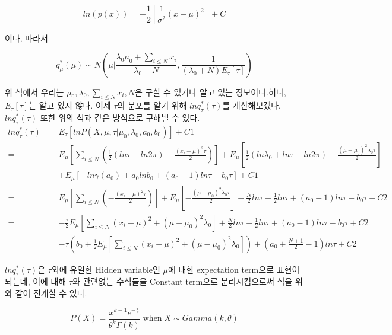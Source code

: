 \documentclass[draft=false]{oblivoir}
\begin{document}
\begin{equation}
ln(p(x)) = -\frac{1}{2} \left[ \frac{1}{\sigma^{2}}(x-\mu)^{2}\right] +C
\label{eq:11-2-10}
\end{equation}

이다. 따라서 

\begin{equation}
q_{\mu}^{*}(\mu) \sim N \left( \mu| \frac{\lambda_{0}\mu_{0}+\sum_{i \leq N}x_{i}}{\lambda_{0}+N} , \frac{1}{(\lambda_{0}+N)E_{\tau}[\tau]}\right)
\label{eq:11-2-11}
\end{equation}

위 식에서 우리는 $\mu_{0},\lambda_{0}, \sum_{i \leq N}x_{i}, N$은 구할 수 있거나 알고 있는 정보이다.허나, $E_{\tau}[\tau]$는 알고 있지 않다. 이제 $\tau$의 분포를 알기 위해 $lnq_{\tau}^{*}(\tau)$를 계산해보겠다.  $lnq_{\tau}^{*}(\tau)$ 또한 위의 식과 같은 방식으로 구해낼 수 있다. 
\begin{align}
lnq_{\tau}^*(\tau)\nonumber = {} & E_{\tau}\left[ lnP(X,\mu,\tau|\mu_{0},\lambda_{0},a_{0},b_{0}) \right] +C1\nonumber\\
= {} & E_{\mu}\left[ \sum_{i \leq N}\left( \frac{1}{2}(ln\tau -ln2 \pi) - \frac{(x_{i}-\mu)^{2}\tau}{2} \right) \right] + E_{\mu}\left[ \frac{1}{2}(ln \lambda_{0} + ln\tau-ln2 \pi ) - \frac{(\mu -\mu_{0})^{2}\lambda_{0}\tau}{2}\right]\nonumber\\
& + E_{\mu}\left[-ln\gamma(a_{0})+a_{0}lnb_{0}+(a_{0}-1)ln\tau-b_{0}\tau  \right]+C1\nonumber\\
= {} & E_{\mu}\left[ \sum_{i \leq N}\left(-\frac{(x_{i}-\mu)^{2}\tau}{2}\right)\right]+E_{\mu}\left[  - \frac{(\mu -\mu_{0})^{2}\lambda_{0} \tau}{2}\right]+\frac{N}{2}ln\tau+\frac{1}{2}ln\tau+(a_{0}-1)ln\tau-b_{0}\tau+C2\nonumber\\
= {} & -\frac{\tau}{2}E_{\mu}\left[\sum_{i \leq N}(x_{i}-\mu)^2+(\mu-\mu_{0})^2\lambda_{0}\right]+\frac{N}{2}ln\tau+\frac{1}{2}ln\tau+(a_{0}-1)ln\tau-b_{0}\tau+C2\nonumber\\
= {} & -\tau\left(b_{0}+\frac{1}{2}E_{\mu}\left[ \sum_{i \leq N}(x_{i}-\mu)^2+(\mu-\mu_{0})^2\lambda_{0}\right]\right) + (a_{0}+\frac{N+1}{2}-1)ln\tau+C2
\label{eq:11-2-8-2}
\end{align}

$lnq_{\tau}^*(\tau)$은 $\tau$외에 유일한 Hidden variable인 $\mu$에 대한 expectation term으로 표현이 되는데, 이에 대해  $\tau$와 관련없는 수식들을 Constant term으로 분리시킴으로써 식을 위와 같이 전개할 수 있다. 

\begin{equation}
P(X) = \frac{x^{k-1}e^{-\frac{x}{\theta}}}{\theta^k\Gamma(k)}  \;\text{when}\; X \sim Gamma(k,\theta)
\label{eq:11-2-11-2}
\end{equation}
\end{document}
